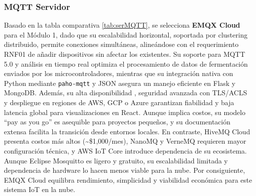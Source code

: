 \subsubsection{MQTT Servidor}
Basado en la tabla comparativa \cref{tab:serMQTT}, se selecciona \textbf{EMQX Cloud}
para el Módulo 1, dado que su escalabilidad horizontal, soportada por clustering distribuido,
permite conexiones simultáneas, alineándose con el requerimiento RNF01 
de añadir dispositivos sin afectar los existentes. Su soporte para MQTT 5.0 y análisis en 
tiempo real optimiza el procesamiento de datos de fermentación enviados por los microcontroladores, mientras
que su integración nativa con Python mediante \texttt{paho-mqtt} y JSON asegura un manejo 
eficiente en Flask y MongoDB. Además, su alta disponibilidad , 
seguridad avanzada con TLS/ACLS y despliegue en regiones de AWS, GCP o Azure garantizan
fiabilidad y baja latencia global para visualizaciones en React. Aunque implica costos,
su modelo ``pay as you go'' es 
asequible para proyectos pequeños, y su documentación extensa facilita la transición
desde entornos locales. En contraste, HiveMQ Cloud presenta costos más altos
(\textasciitilde\$1,000/mes), NanoMQ y VerneMQ requieren mayor configuración técnica,
y AWS IoT Core introduce dependencia de su ecosistema. 
Aunque Eclipse Mosquitto es ligero y gratuito, su escalabilidad limitada 
y dependencia de hardware lo hacen menos viable para la nube. Por consiguiente,
EMQX Cloud equilibra rendimiento, simplicidad y viabilidad económica para este sistema
IoT en la nube.



\begingroup
\setlength{\tabcolsep}{4pt} %
\renewcommand{\arraystretch}{1.5} %
\small %

